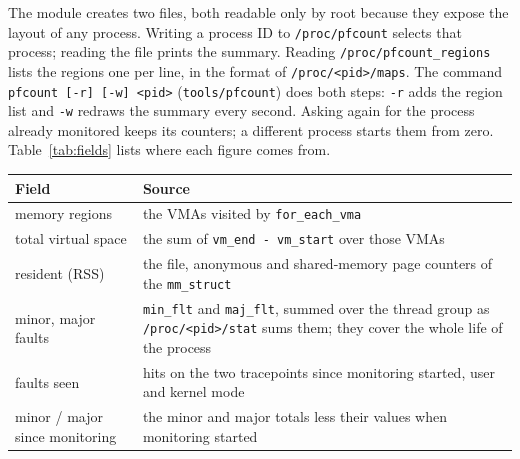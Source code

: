The module creates two files, both readable only by root because they expose
the layout of any process. Writing a process ID to \texttt{/proc/pfcount}
selects that process; reading the file prints the summary. Reading
\texttt{/proc/pfcount\_regions} lists the regions one per line, in the format
of \texttt{/proc/<pid>/maps}. The command \texttt{pfcount [-r] [-w] <pid>}
(\texttt{tools/pfcount}) does both steps: \texttt{-r} adds the region list and
\texttt{-w} redraws the summary every second. Asking again for the process
already monitored keeps its counters; a different process starts them from
zero. Table~\ref{tab:fields} lists where each figure comes from.

\begin{center}
\small
\begin{tabular}{@{}lp{9.6cm}@{}}
\toprule
Field & Source \\
\midrule
memory regions & the VMAs visited by \texttt{for\_each\_vma} \\
total virtual space & the sum of \texttt{vm\_end - vm\_start} over those VMAs \\
resident (RSS) & the file, anonymous and shared-memory page counters of the \texttt{mm\_struct} \\
minor, major faults & \texttt{min\_flt} and \texttt{maj\_flt}, summed over the thread group
  as \texttt{/proc/<pid>/stat} sums them; they cover the whole life of the process \\
faults seen & hits on the two tracepoints since monitoring started, user and kernel mode \\
minor / major since monitoring & the minor and major totals less their values when monitoring started \\
\bottomrule
\end{tabular}
\label{tab:fields}
\end{center}

